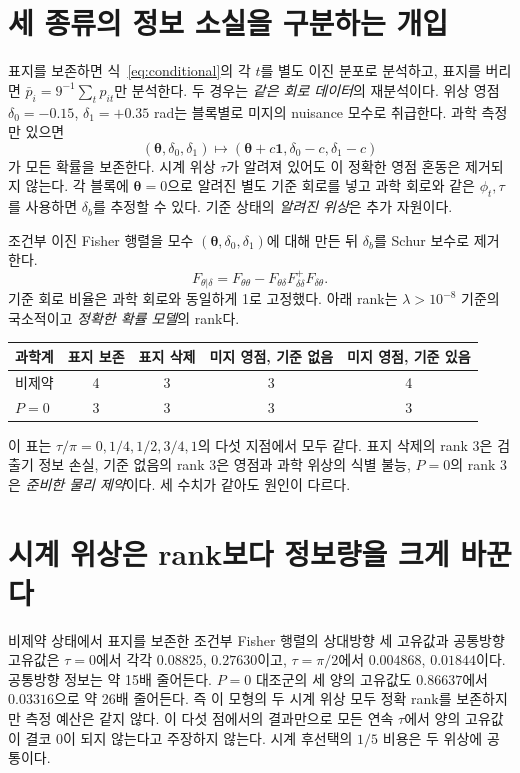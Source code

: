 \documentclass[11pt,a4paper]{article}
\begin{document}
\section{세 종류의 정보 소실을 구분하는 개입}
표지를 보존하면 식~\eqref{eq:conditional}의 각 $t$를 별도 이진 분포로
분석하고, 표지를 버리면 $\bar p_i=9^{-1}\sum_t p_{it}$만 분석한다.
두 경우는 \emph{같은 회로 데이터}의 재분석이다. 위상 영점
$\delta_0=-0.15$, $\delta_1=+0.35$ rad는 블록별로 미지의 nuisance
모수로 취급한다. 과학 측정만 있으면
\begin{equation}
 (\boldsymbol\theta,\delta_0,\delta_1)
 \mapsto(\boldsymbol\theta+c\boldsymbol1,\delta_0-c,\delta_1-c)
\end{equation}
가 모든 확률을 보존한다. 시계 위상 $\tau$가 알려져 있어도 이 정확한
영점 혼동은 제거되지 않는다. 각 블록에 $\boldsymbol\theta=0$으로
알려진 별도 기준 회로를 넣고 과학 회로와 같은 $\phi_t,\tau$를 사용하면
$\delta_b$를 추정할 수 있다. 기준 상태의 \emph{알려진 위상}은 추가 자원이다.

조건부 이진 Fisher 행렬을 모수 $(\boldsymbol\theta,\delta_0,\delta_1)$에
대해 만든 뒤 $\delta_b$를 Schur 보수로 제거한다.
\begin{equation}
 F_{\theta|\delta}=F_{\theta\theta}-
 F_{\theta\delta}F_{\delta\delta}^{+}F_{\delta\theta}.
\end{equation}
기준 회로 비율은 과학 회로와 동일하게 1로 고정했다. 아래 rank는
$\lambda>10^{-8}$ 기준의 국소적이고 \emph{정확한 확률 모델}의 rank다.
\begin{center}
\begin{tabular}{@{}lcccc@{}}
\toprule
과학계 & 표지 보존 & 표지 삭제 & 미지 영점, 기준 없음 & 미지 영점, 기준 있음 \\
\midrule
비제약 & 4 & 3 & 3 & 4 \\
$P=0$ & 3 & 3 & 3 & 3 \\
\bottomrule
\end{tabular}
\end{center}
이 표는 $\tau/\pi=0,1/4,1/2,3/4,1$의 다섯 지점에서 모두 같다.
표지 삭제의 rank 3은 검출기 정보 손실, 기준 없음의 rank 3은 영점과
과학 위상의 식별 불능, $P=0$의 rank 3은 \emph{준비한 물리 제약}이다.
세 수치가 같아도 원인이 다르다.

\section{시계 위상은 rank보다 정보량을 크게 바꾼다}
비제약 상태에서 표지를 보존한 조건부 Fisher 행렬의 상대방향 세 고유값과
공통방향 고유값은 $\tau=0$에서 각각 $0.08825$, $0.27630$이고,
$\tau=\pi/2$에서 $0.004868$, $0.01844$이다. 공통방향 정보는 약
15배 줄어든다. $P=0$ 대조군의 세 양의 고유값도 $0.86637$에서
$0.03316$으로 약 26배 줄어든다. 즉 이 모형의 두 시계 위상 모두 정확
rank를 보존하지만 측정 예산은 같지 않다. 이 다섯 점에서의 결과만으로
모든 연속 $\tau$에서 양의 고유값이 결코 0이 되지 않는다고 주장하지 않는다.
시계 후선택의 $1/5$ 비용은 두 위상에 공통이다.
\end{document}
